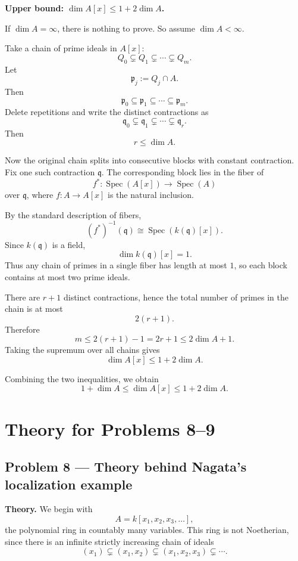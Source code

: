 \documentclass[12pt,a4paper]{article}
\theoremstyle{plain}
\theoremstyle{definition}      %
\begin{document}
	\medskip
	
	\textbf{Upper bound: \(\dim A[x]\le 1+2\dim A\).}
	
	If \(\dim A=\infty\), there is nothing to prove. So assume \(\dim A<\infty\).
	
	Take a chain of prime ideals in \(A[x]\):
	\[
	Q_0\subsetneq Q_1\subsetneq \cdots \subsetneq Q_m.
	\]
	Let
	\[
	\mathfrak p_j:=Q_j\cap A.
	\]
	Then
	\[
	\mathfrak p_0\subseteq \mathfrak p_1\subseteq \cdots \subseteq \mathfrak p_m.
	\]
	Delete repetitions and write the distinct contractions as
	\[
	\mathfrak q_0\subsetneq \mathfrak q_1\subsetneq \cdots \subsetneq \mathfrak q_r.
	\]
	Then
	\[
	r\le \dim A.
	\]
	
	Now the original chain splits into consecutive blocks with constant contraction. Fix one such contraction \(\mathfrak q\). The corresponding block lies in the fiber of
	\[
	f^*:\operatorname{Spec}(A[x])\to \operatorname{Spec}(A)
	\]
	over \(\mathfrak q\), where \(f:A\to A[x]\) is the natural inclusion.
	
	By the standard description of fibers,
	\[
	(f^*)^{-1}(\mathfrak q)\cong \operatorname{Spec}(k(\mathfrak q)[x]).
	\]
	Since \(k(\mathfrak q)\) is a field,
	\[
	\dim k(\mathfrak q)[x]=1.
	\]
	Thus any chain of primes in a single fiber has length at most \(1\), so each block contains at most two prime ideals.
	
	There are \(r+1\) distinct contractions, hence the total number of primes in the chain is at most
	\[
	2(r+1).
	\]
	Therefore
	\[
	m\le 2(r+1)-1 = 2r+1 \le 2\dim A+1.
	\]
	Taking the supremum over all chains gives
	\[
	\dim A[x]\le 1+2\dim A.
	\]
	
	Combining the two inequalities, we obtain
	\[
	1+\dim A \le \dim A[x] \le 1+2\dim A.
	\]
	

\section*{Theory for Problems 8--9}

\subsection*{Problem 8 --- Theory behind Nagata's localization example}

\textbf{Theory.}
We begin with
\[
A=k[x_1,x_2,x_3,\dots],
\]
the polynomial ring in countably many variables. This ring is not Noetherian, since there is an infinite strictly increasing chain of ideals
\[
(x_1)\subsetneq (x_1,x_2)\subsetneq (x_1,x_2,x_3)\subsetneq \cdots.
\]
\end{document}
